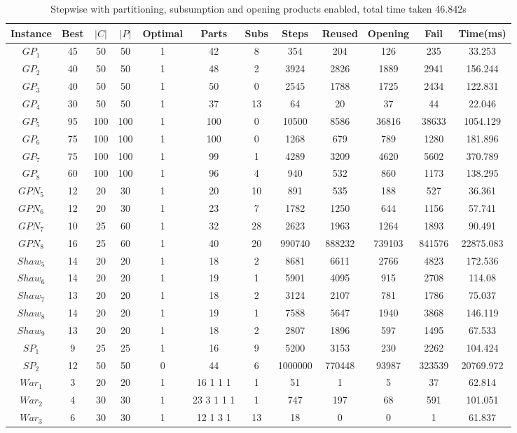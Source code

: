 \begin{table}[H]
\begin{tabular}{|c|c|c|c|c|c|c|c|c|c|c|c|} \hline
Instance&Best&$|C|$&$|P|$&Optimal&Parts&Subs&Steps&Reused&Opening&Fail&Time(ms) \\\hline
$GP_1$&45&50&50&1&42 &8&354&204&126&235&33.253\\ 
$GP_2$&40&50&50&1&48 &2&3924&2826&1889&2941&156.244\\ 
$GP_3$&40&50&50&1&50 &0&2545&1788&1725&2434&122.831\\ 
$GP_4$&30&50&50&1&37 &13&64&20&37&44&22.046\\ 
$GP_5$&95&100&100&1&100 &0&10500&8586&36816&38633&1054.129\\ 
$GP_6$&75&100&100&1&100 &0&1268&679&789&1280&181.896\\ 
$GP_7$&75&100&100&1&99 &1&4289&3209&4620&5602&370.789\\ 
$GP_8$&60&100&100&1&96 &4&940&532&860&1173&138.295\\ 
$GPN_5$&12&20&30&1&20 &10&891&535&188&527&36.361\\ 
$GPN_6$&12&20&30&1&23 &7&1782&1250&644&1156&57.741\\ 
$GPN_7$&10&25&60&1&32 &28&2623&1963&1264&1893&90.491\\ 
$GPN_8$&16&25&60&1&40 &20&990740&888232&739103&841576&22875.083\\ 
$Shaw_5$&14&20&20&1&18 &2&8681&6611&2766&4823&172.536\\ 
$Shaw_6$&14&20&20&1&19 &1&5901&4095&915&2708&114.08\\ 
$Shaw_7$&13&20&20&1&18 &2&3124&2107&781&1786&75.037\\ 
$Shaw_8$&14&20&20&1&19 &1&7588&5647&1940&3868&146.119\\ 
$Shaw_9$&13&20&20&1&18 &2&2807&1896&597&1495&67.533\\ 
$SP_1$&9&25&25&1&16 &9&5200&3153&230&2262&104.424\\ 
$SP_2$&12&50&50&0&44 &6&1000000&770448&93987&323539&20769.972\\ 
$War_1$&3&20&20&1&16 1 1 1 &1&51&1&5&37&62.814\\ 
$War_2$&4&30&30&1&23 3 1 1 1 &1&747&197&68&591&101.051\\ 
$War_3$&6&30&30&1&12 1 3 1 &13&18&0&0&1&61.837\\ 
\hline
\end{tabular}
\caption{ Stepwise with partitioning, subsumption and opening products enabled, total time taken 46.842s}
\end{table}



